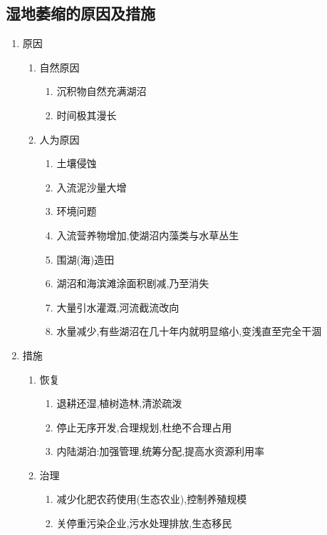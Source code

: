 \documentclass[a4paper]{article}
\begin{document}
    \subsection{湿地萎缩的原因及措施}
    \begin{enumerate}
        \item 原因
        \begin{enumerate}
            \item 自然原因
            \begin{enumerate}
                \item 沉积物自然充满湖沼
                \item 时间极其漫长
            \end{enumerate}
            \item 人为原因
            \begin{enumerate}
                \item 土壤侵蚀
                    \item 入流泥沙量大增
                \item 环境问题
                    \item 入流营养物增加,使湖沼内藻类与水草丛生
                \item 围湖(海)造田
                    \item 湖沼和海滨滩涂面积剧减,乃至消失
                \item 大量引水灌溉,河流截流改向
                    \item 水量减少,有些湖沼在几十年内就明显缩小,变浅直至完全干涸
            \end{enumerate}
        \end{enumerate}
        \item 措施
        \begin{enumerate}
            \item 恢复
            \begin{enumerate}
                \item 退耕还湿,植树造林,清淤疏泼
                \item 停止无序开发,合理规划,杜绝不合理占用
                \item 内陆湖泊:加强管理,统筹分配,提高水资源利用率
            \end{enumerate}
            \item 治理
            \begin{enumerate}
                \item 减少化肥农药使用(生态农业),控制养殖规模
                \item 关停重污染企业,污水处理排放,生态移民

\end{enumerate}
\end{enumerate}
\end{enumerate}
\end{document}
